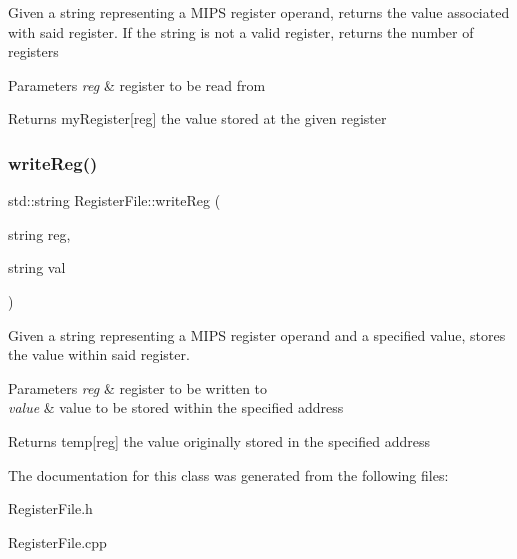 Given a string representing a M\+I\+PS register operand, returns the value associated with said register. If the string is not a valid register, returns the number of registers 
\begin{DoxyParams}{Parameters}
{\em reg} & register to be read from \\
\hline
\end{DoxyParams}
\begin{DoxyReturn}{Returns}
my\+Register\mbox{[}reg\mbox{]} the value stored at the given register 
\end{DoxyReturn}
\mbox{\label{class_register_file_a4e4802bee78d7c7173c829764babca9c}} 
\subsubsection{\texorpdfstring{write\+Reg()}{writeReg()}}
{\footnotesize\ttfamily std\+::string Register\+File\+::write\+Reg (\begin{DoxyParamCaption}\item[{string}]{reg,  }\item[{string}]{val }\end{DoxyParamCaption})}

Given a string representing a M\+I\+PS register operand and a specified value, stores the value within said register. 
\begin{DoxyParams}{Parameters}
{\em reg} & register to be written to \\
\hline
{\em value} & value to be stored within the specified address \\
\hline
\end{DoxyParams}
\begin{DoxyReturn}{Returns}
temp\mbox{[}reg\mbox{]} the value originally stored in the specified address 
\end{DoxyReturn}


The documentation for this class was generated from the following files\+:\begin{DoxyCompactItemize}
\item 
Register\+File.\+h\item 
Register\+File.\+cpp\end{DoxyCompactItemize}
